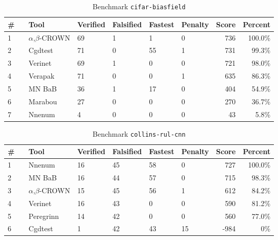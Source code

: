 \begin{table}[h]
\begin{center}
\caption{Benchmark \texttt{cifar-biasfield}} \label{tab:cat_{cat}}
{\setlength{\tabcolsep}{2pt}
\begin{tabular}[h]{@{}llllllrr@{}}
\toprule
\textbf{\# ~} & \textbf{Tool} & \textbf{Verified} & \textbf{Falsified} & \textbf{Fastest} & \textbf{Penalty} & \textbf{Score} & \textbf{Percent}\\
\midrule
1 & $\alpha$,$\beta$-CROWN & 69 & 1 & 1 & 0 & 736 & 100.0\% \\
2 & Cgdtest & 71 & 0 & 55 & 1 & 731 & 99.3\% \\
3 & Verinet & 69 & 1 & 0 & 0 & 721 & 98.0\% \\
4 & Verapak & 71 & 0 & 0 & 1 & 635 & 86.3\% \\
5 & MN BaB & 36 & 1 & 17 & 0 & 404 & 54.9\% \\
6 & Marabou & 27 & 0 & 0 & 0 & 270 & 36.7\% \\
7 & Nnenum & 4 & 0 & 0 & 0 & 43 & 5.8\% \\
\bottomrule
\end{tabular}
}
\end{center}
\end{table}




\begin{table}[h]
\begin{center}
\caption{Benchmark \texttt{collins-rul-cnn}} \label{tab:cat_{cat}}
{\setlength{\tabcolsep}{2pt}
\begin{tabular}[h]{@{}llllllrr@{}}
\toprule
\textbf{\# ~} & \textbf{Tool} & \textbf{Verified} & \textbf{Falsified} & \textbf{Fastest} & \textbf{Penalty} & \textbf{Score} & \textbf{Percent}\\
\midrule
1 & Nnenum & 16 & 45 & 58 & 0 & 727 & 100.0\% \\
2 & MN BaB & 16 & 44 & 57 & 0 & 715 & 98.3\% \\
3 & $\alpha$,$\beta$-CROWN & 15 & 45 & 56 & 1 & 612 & 84.2\% \\
4 & Verinet & 16 & 43 & 0 & 0 & 590 & 81.2\% \\
5 & Peregrinn & 14 & 42 & 0 & 0 & 560 & 77.0\% \\
6 & Cgdtest & 1 & 42 & 43 & 15 & -984 & 0\% \\
\bottomrule
\end{tabular}
}
\end{center}
\end{table}



